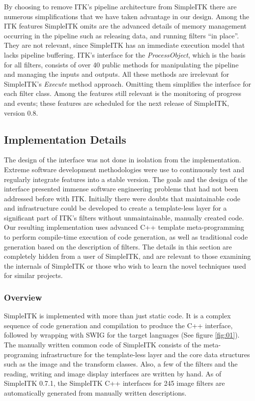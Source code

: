 \documentclass{frontiersMED} %
\begin{document}
By choosing to remove ITK's pipeline architecture from SimpleITK there
are numerous simplifications that we have taken advantage in our
design. Among the ITK features SimpleITK omits are the advanced
details of memory management occurring in the pipeline such as
releasing data, and running filters “in place”. They are not relevant,
since SimpleITK has an immediate execution model that lacks pipeline
buffering. ITK's interface for the \textit{ProcessObject}, which is the basis
for all filters, consists of over 40 public methods for manipulating
the pipeline and managing the inputs and outputs. All these methods
are irrelevant for SimpleITK's \textit{Execute} method approach. Omitting them
simplifies the interface for each filter class.  Among the features
still relevant is the monitoring of progress and events; these
features are scheduled for the next release of SimpleITK, version 0.8.

\subsection{Implementation Details}
The design of the interface was not done in isolation from the
implementation. Extreme software development methodologies were use to
continuously test and regularly integrate features into a stable
version.  The goals and the design of the interface presented immense
software engineering problems that had not been addressed before with
ITK. Initially there were doubts that maintainable code and
infrastructure could be developed to create a template-less layer for
a significant part of ITK's filters without unmaintainable, manually
created code. Our resulting implementation uses advanced C++ template
meta-programming to perform compile-time execution of code generation,
as well as traditional code generation based on the description of
filters. The details in this section are completely hidden from a user
of SimpleITK, and are relevant to those examining the internals of
SimpleITK or those who wish to learn the novel techniques used for
similar projects.

\subsubsection{Overview}
SimpleITK is implemented with more than just static code. It is a
complex sequence of code generation and compilation to produce the C++
interface, followed by wrapping with SWIG for the target
languages (See figure \ref{fig:01}). The manually written common code of SimpleITK consists of
the meta-programing infrastructure for the template-less layer and the
core data structures such as the image and the transform
classes. Also, a few of the filters and the reading, writing and image
display interfaces are written by hand. As of SimpleITK 0.7.1, the
SimpleITK C++ interfaces for 245 image filters are automatically
generated from manually written descriptions.
\end{document}
